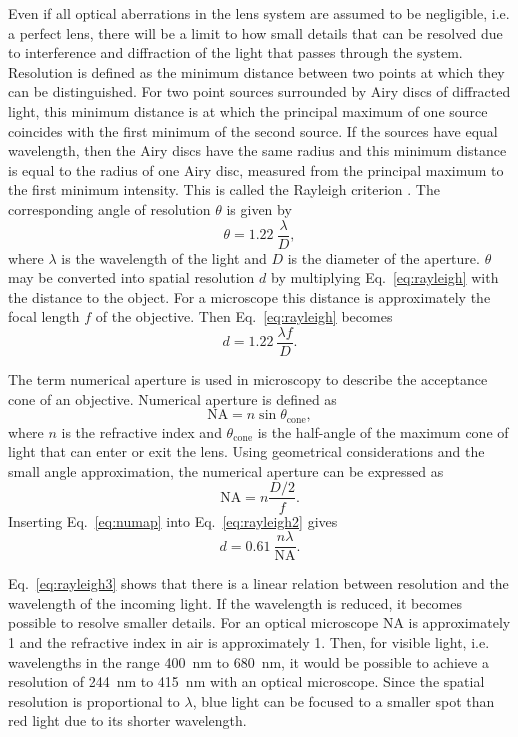 Even if all optical aberrations in the lens system are assumed to be negligible, i.e. a perfect lens, there will be a limit to how small details that can be resolved due to interference and diffraction of the light that passes through the system. Resolution is defined as the minimum distance between two points at which they can be distinguished. For two point sources surrounded by Airy discs of diffracted light, this minimum distance is at which the principal maximum of one source coincides with the first minimum of the second source. If the sources have equal wavelength, then the Airy discs have the same radius and this minimum distance is equal to the radius of one Airy disc, measured from the principal maximum to the first minimum intensity. This is called the Rayleigh criterion \citep{rayleigh1879investigations, rayleigh1880investigations}. The corresponding angle of resolution $\theta$ is given by
\begin{equation}\label{eq:rayleigh}
\theta = \SI{1.22}{}\frac{\lambda}{D},
\end{equation}
where $\lambda$ is the wavelength of the light and $D$ is the diameter of the aperture. $\theta$ may be converted into spatial resolution $d$ by multiplying Eq.~\eqref{eq:rayleigh} with the distance to the object. For a microscope this distance is approximately the focal length $f$ of the objective. Then Eq.~\eqref{eq:rayleigh} becomes
\begin{equation}\label{eq:rayleigh2}
d = \SI{1.22}{}\frac{\lambda f}{D}.
\end{equation}

The term numerical aperture is used in microscopy to describe the acceptance cone of an objective. Numerical aperture is defined as
\[\text{NA}=n\sin\theta_\text{cone},\]
where $n$ is the refractive index and $\theta_\text{cone}$ is the half-angle of the maximum cone of light that can enter or exit the lens. Using geometrical considerations and the small angle approximation, the numerical aperture can be expressed as
\begin{equation}\label{eq:numap}
\text{NA} = n\frac{D/2}{f}.
\end{equation}
Inserting Eq.~\eqref{eq:numap} into Eq.~\eqref{eq:rayleigh2} gives
\begin{equation}\label{eq:rayleigh3}
d = \SI{0.61}{}\frac{n\lambda}{\text{NA}}.
\end{equation}

Eq.~\eqref{eq:rayleigh3} shows that there is a linear relation between resolution and the wavelength of the incoming light. If the wavelength is reduced, it becomes possible to resolve smaller details. For an optical microscope $\text{NA}$ is approximately 1 and the refractive index in air is approximately 1. Then, for visible light, i.e. wavelengths in the range \SI{400}{\nano\metre} to \SI{680}{\nano\metre}, it would be possible to achieve a resolution of \SI{244}{\nano\metre} to \SI{415}{\nano\metre} with an optical microscope. Since the spatial resolution is proportional to $\lambda$, blue light can be focused to a smaller spot than red light due to its shorter wavelength.
